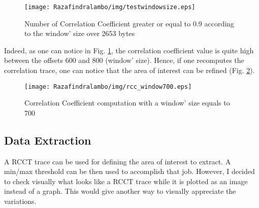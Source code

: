 \begin{figure}[!h]
    \center
    \texttt{[image: Razafindralambo/img/testwindowsize.eps]}
    \caption{Number of Correlation Coefficient greater or equal to 0.9 according to
    the window' size over 2653 bytes}
    \label{fig:testwindowsize}
\end{figure} 

Indeed, 
as one can notice in Fig. \ref{fig:testwindowsize}, the correlation coefficient value is quite high between the offsets 600 and 800 (window'
size). Hence, if one recomputes the correlation trace, one can notice that the area of interest can
be refined (Fig. \ref{fig:window700}).

\begin{figure}[!h]
    \center
    \texttt{[image: Razafindralambo/img/rcc\_window700.eps]}
    \caption{Correlation Coefficient computation with a window' size equals to 700}
    \label{fig:window700}
\end{figure}




\subsection{Data Extraction}
A RCCT trace can be used for defining the area of interest to extract. A min/max threshold can be
then used to accomplish that job.
However, I decided to check visually what looks like a RCCT trace while it is plotted as an image instead of
a graph. This would give another way to visually appreciate the variations.

